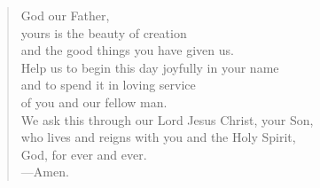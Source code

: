 \prayer

\setlength{\leftmargini}{\prayerleftmargini}

\begin{verse}
God our Father,\\
yours is the beauty of creation\\
and the good things you have given us.\\
Help us to begin this day joyfully in your name\\
and to spend it in loving service\\
of you and our fellow man.\\
We ask this through our Lord Jesus Christ, your Son,\\
who lives and reigns with you and the Holy Spirit,\\
God, for ever and ever.\\
{\color{red}---\thinspace}Amen.
\end{verse}

\setlength{\leftmargini}{\defleftmargini}